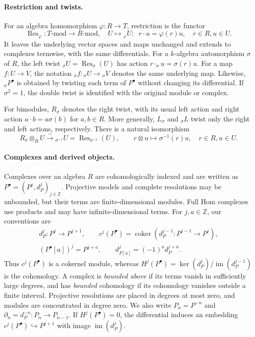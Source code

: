 \documentclass[11pt]{article}
\begin{document}
\paragraph{Restriction and twists.}
For an algebra homomorphism $\varphi:R\to T$, restriction is the
functor
\[
 \operatorname{Res}_\varphi:T\text{-}\mathrm{mod}\longrightarrow R\text{-}\mathrm{mod},\quad U\mapsto {_\varphi}U:\;\;r\cdot u=\varphi(r)u, \quad r\in R, u\in U.
\]
It leaves the underlying vector spaces and maps unchanged and
extends to complexes termwise, with the same differentials.
For a $k$-algebra automorphism $\sigma$ of $R$, the left twist
$ {}_\sigma U=\operatorname{Res}_\sigma(U)$ has action
$r\cdot_\sigma u=\sigma(r)u$.
For a map $f:U\to V$, the notation
$ {}_\sigma f:{}_\sigma U\to{}_\sigma V$ denotes the same
underlying map. Likewise, $ {}_\sigma P^\bullet$ is obtained by
twisting each term of $P^\bullet$ without changing its differential.
If $\sigma^2=1$, the double twist is identified with the original
module or complex.

For bimodules, $R_\sigma$ denotes the right twist, with its usual
left action and right action $a\cdot b=a\sigma(b)$ for $a,b\in R$.
More generally, $L_\sigma$ and $ {}_\sigma L$ twist only the right
and left actions, respectively. There is a natural isomorphism
\[
 R_\sigma\otimes_RU\xrightarrow{\sim}
 {}_{\sigma^{-1}}U=\operatorname{Res}_{\sigma^{-1}}(U),
 \qquad r\otimes u\longmapsto\sigma^{-1}(r)u,\quad r\in R, u\in U.
\]

\paragraph{Complexes and derived objects.}
Complexes over an algebra $R$ are cohomologically indexed and are written as
$P^\bullet=(P^j, d_P^j)_{j\in\mathbb{Z}}$. Projective models and complete resolutions may be unbounded, but
their terms are finite-dimensional modules. Full Hom complexes
use products and may have infinite-dimensional terms.
For $j,a\in\mathbb Z$, our conventions are
\begin{equation*}
 \begin{gathered}
 d_P^j:P^j\longrightarrow P^{j+1},\qquad
 c^j(P^\bullet)=\operatorname{coker}(d_P^{j-1}:P^{j-1}\to P^j),\\
 (P^\bullet[a])^j=P^{j+a},\qquad d_{P[a]}^j=(-1)^a d_P^{j+a}.
 \end{gathered}
\end{equation*}
Thus $c^j(P^\bullet)$ is a cokernel module, whereas
$H^j(P^\bullet)=\ker(d_P^j)/\operatorname{im}(d_P^{j-1})$ is the cohomology.
A complex is \emph{bounded above} if its terms vanish in sufficiently
large degrees, and has \emph{bounded} cohomology if its cohomology
vanishes outside a finite interval. Projective resolutions are
placed in degrees at most zero, and modules are concentrated in
degree zero. We also write $P_n=P^{-n}$ and
$\partial_n=d_P^{-n}:P_n\to P_{n-1}$. If $H^j(P^\bullet)=0$, the
differential induces an embedding
$c^j(P^\bullet)\hookrightarrow P^{j+1}$ with image $\operatorname{im}(d_P^j)$.
\end{document}
